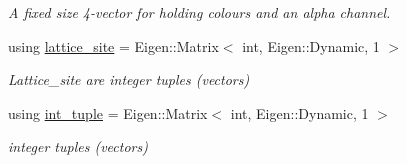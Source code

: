 \begin{DoxyCompactItemize}
\begin{DoxyCompactList}\small\item\em A fixed size 4-\/vector for holding colours and an alpha channel. \end{DoxyCompactList}\item 
\mbox{\label{namespacesisl_acd18feee4026583db6185df2b25434aa}} 
using \hyperlink{namespacesisl_acd18feee4026583db6185df2b25434aa}{lattice\+\_\+site} = Eigen\+::\+Matrix$<$ int, Eigen\+::\+Dynamic, 1 $>$
\begin{DoxyCompactList}\small\item\em Lattice\+\_\+site are integer tuples (vectors) \end{DoxyCompactList}\item 
\mbox{\label{namespacesisl_adc492e1c166a136d08b283394d81cd71}} 
using \hyperlink{namespacesisl_adc492e1c166a136d08b283394d81cd71}{int\+\_\+tuple} = Eigen\+::\+Matrix$<$ int, Eigen\+::\+Dynamic, 1 $>$
\begin{DoxyCompactList}\small\item\em integer tuples (vectors) \end{DoxyCompactList}\end{DoxyCompactItemize}
